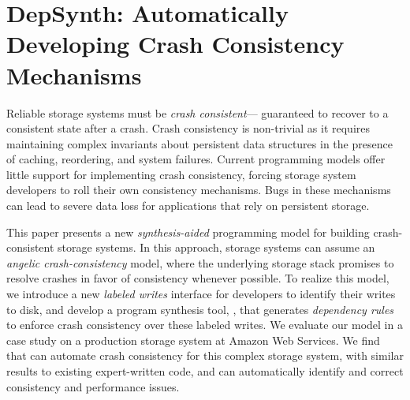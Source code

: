 %
\chapter{DepSynth: Automatically Developing Crash Consistency Mechanisms}
\label{c:depsynth}

Reliable storage systems must be \emph{crash consistent}---%
guaranteed to recover to a consistent state after a crash. %
Crash consistency is non-trivial
as it requires maintaining complex invariants
about persistent data structures 
in the presence of caching, reordering, and system failures.
Current programming models offer little support for implementing crash consistency,
forcing storage system developers to roll their own consistency mechanisms.
Bugs in these mechanisms can lead to severe data loss
for applications that rely on persistent storage.\tighten

This paper presents a new \emph{synthesis-aided} programming model
for building crash-consistent storage systems.
In this approach, storage systems can assume
an \emph{angelic crash-consistency} model,
where the underlying storage stack
promises to resolve crashes in favor of consistency whenever possible.
To realize this model,
we introduce a new \emph{labeled writes} interface for developers to identify their writes to disk,
and develop a program synthesis tool, \depsynth,
that generates \emph{dependency rules}
to enforce crash consistency over these labeled writes.
We evaluate our model in a case study
on a production storage system at Amazon Web Services.
We find that \depsynth can automate crash consistency for this complex storage system,
with similar results to existing expert-written code,
and can automatically identify and correct consistency and performance issues.









% 









% 
